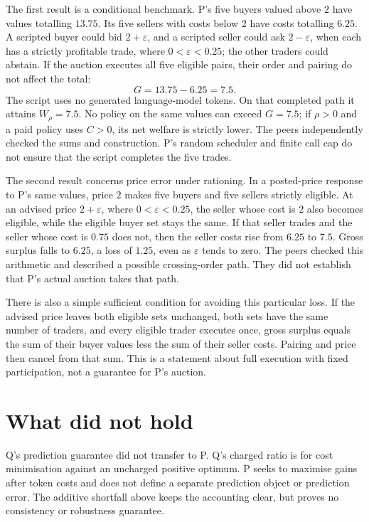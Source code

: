 \documentclass{article}
\begin{document}
The first result is a conditional benchmark. P's five buyers valued above \(2\) have values totalling
\(13.75\). Its five sellers with costs below \(2\) have costs totalling \(6.25\). A scripted buyer could
bid \(2+\varepsilon\), and a scripted seller could ask \(2-\varepsilon\), when each has a strictly
profitable trade, where \(0<\varepsilon<0.25\); the other traders could abstain. If the auction executes
all five eligible pairs, their order and pairing do not affect the total:
\[
G=13.75-6.25=7.5.
\]
The script uses no generated language-model tokens. On that completed path it attains \(W_{\rho}=7.5\).
No policy on the same values can exceed \(G=7.5\); if \(\rho>0\) and a paid policy uses \(C>0\), its net
welfare is strictly lower. The peers independently checked the sums and construction. P's random
scheduler and finite call cap do not ensure that the script completes the five trades.

The second result concerns price error under rationing. In a posted-price response to P's same values,
price \(2\) makes five buyers and five sellers strictly eligible. At an advised price \(2+\varepsilon\),
where \(0<\varepsilon<0.25\), the seller whose cost is \(2\) also becomes eligible, while the eligible
buyer set stays the same. If that seller trades and the seller whose cost is \(0.75\) does not, then the
seller costs rise from \(6.25\) to \(7.5\). Gross surplus falls to \(6.25\), a loss of \(1.25\), even as
\(\varepsilon\) tends to zero. The peers checked this arithmetic and described a possible crossing-order
path. They did not establish that P's actual auction takes that path.

There is also a simple sufficient condition for avoiding this particular loss. If the advised price
leaves both eligible sets unchanged, both sets have the same number of traders, and every eligible trader
executes once, gross surplus equals the sum of their buyer values less the sum of their seller costs.
Pairing and price then cancel from that sum. This is a statement about full execution with fixed
participation, not a guarantee for P's auction.

\section{What did not hold}

Q's prediction guarantee did not transfer to P. Q's charged ratio is for cost minimisation against an
uncharged positive optimum. P seeks to maximise gains after token costs and does not define a separate
prediction object or prediction error. The additive shortfall above keeps the accounting clear, but
proves no consistency or robustness guarantee.
\end{document}
